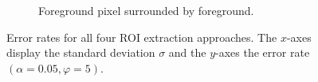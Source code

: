 \begin{figure}[H]
\begin{subfigure}[t]{0.48\linewidth}
		\caption{Foreground pixel surrounded by foreground.}
		\label{fig: alpha0.05_phi5_foreground_free}
	\end{subfigure}
	\caption{Error rates for all four ROI extraction approaches. The $x$-axes display the standard deviation $\sigma$ and the $y$-axes the error rate $(\alpha = 0.05, \varphi = 5)$.}
	\label{fig: alpha0.05_phi5}
\end{figure}